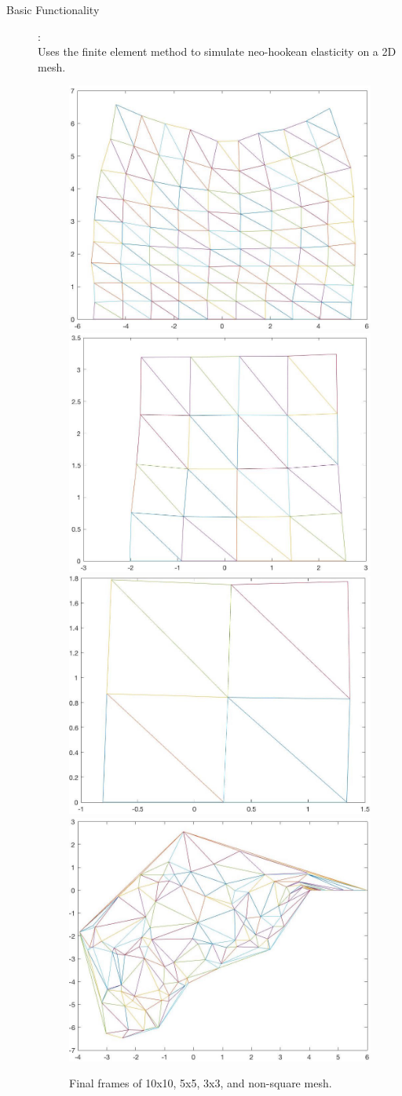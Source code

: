 \documentclass {article}
\begin{document}
	\newpage
	\begin{description}
		\item[Basic Functionality]:\\
		
		Uses the finite element method to simulate neo-hookean elasticity on a 2D mesh. 
		
		\begin{figure}[ht!]
			\includegraphics[width=.45\textwidth]{../final_square_10}\hfill
			\includegraphics[width=.45\textwidth]{../final_square_5}\hfill
			\includegraphics[width=.45\textwidth]{../final_square_3}\hfill
			\includegraphics[width=.45\textwidth]{../non-square}\hfill
			\caption{Final frames of 10x10, 5x5, 3x3, and non-square mesh. }
		\end{figure}
		
		
		
	\end{description}
	
\end{document}
